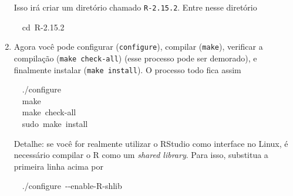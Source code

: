 \documentclass[a4paper,12pt]{article}\usepackage[]{graphicx}\usepackage[]{color}
\makeatletter
\newcommand{\hlnum}[1]{\textcolor[rgb]{0.686,0.059,0.569}{#1}}%
\newcommand{\hlopt}[1]{\textcolor[rgb]{0,0,0}{#1}}%
\newcommand{\hlstd}[1]{\textcolor[rgb]{0.345,0.345,0.345}{#1}}%
\newcommand{\hlkwb}[1]{\textcolor[rgb]{0.69,0.353,0.396}{#1}}%
\newcommand{\hlkwc}[1]{\textcolor[rgb]{0.333,0.667,0.333}{#1}}%
\newenvironment{kframe}{%
 \def\at@end@of@kframe{}%
 \ifinner\ifhmode%
  \def\at@end@of@kframe{\end{minipage}}%
  \begin{minipage}{\columnwidth}%
 \fi\fi%
 \def\FrameCommand##1{\hskip\@totalleftmargin \hskip-\fboxsep
 \colorbox{shadecolor}{##1}\hskip-\fboxsep
     \hskip-\linewidth \hskip-\@totalleftmargin \hskip\columnwidth}%
 \MakeFramed {\advance\hsize-\width
   \@totalleftmargin\z@ \linewidth\hsize
   \@setminipage}}%
 {\par\unskip\endMakeFramed%
 \at@end@of@kframe}
\newenvironment{knitrout}{}{} %
\providecommand{\R}{\textsf{R}\xspace}
\providecommand{\RStudio}{\textsf{RStudio}\xspace}
\makeatother
\begin{document}
\begin{enumerate}
  Isso irá criar um diretório chamado \texttt{R-2.15.2}. Entre nesse
  diretório
\begin{knitrout}\small
{}\color{fgcolor}\begin{kframe}
\noindent
\ttfamily
\hlstd{}\hlstd{\ \ }\hlstd{}\hlkwb{cd\ }\hlstd{R}\hlopt{{-}}\hlstd{}\hlnum{2.15.2}\hlstd{}\hspace*{\fill}
\mbox{}
\normalfont
\normalsize
\end{kframe}
\end{knitrout}

\item Agora você pode configurar (\texttt{configure}), compilar
  (\texttt{make}), verificar a compilação (\texttt{make check-all})
  (esse processo pode ser demorado), e finalmente instalar (\texttt{make
  install}). O processo todo fica assim
\begin{knitrout}\small
{}\color{fgcolor}\begin{kframe}
\noindent
\ttfamily
\hlstd{}\hlstd{\ \ }\hlstd{.}\hlopt{/}\hlstd{configure\hspace*{\fill}\\
}\hlstd{\ \ }\hlstd{}\hlkwc{make}\hspace*{\fill}\\
\hlstd{}\hlstd{\ \ }\hlstd{}\hlkwc{make\ }\hlstd{check}\hlopt{{-}}\hlstd{all\hspace*{\fill}\\
}\hlstd{\ \ }\hlstd{sudo\ }\hlkwc{make\ install}\hlstd{}\hspace*{\fill}
\mbox{}
\normalfont
\normalsize
\end{kframe}
\end{knitrout}

  Detalhe: se você for realmente utilizar o \RStudio como interface no
  Linux, é necessário compilar o \R como um \textit{shared
    library}. Para isso, substitua a primeira linha acima por
\begin{knitrout}\small
{}\color{fgcolor}\begin{kframe}
\noindent
\ttfamily
\hlstd{}\hlstd{\ \ }\hlstd{.}\hlopt{/}\hlstd{configure\ }\hlopt{{-}{-}}\hlstd{}\hlkwb{enable}\hlstd{}\hlopt{{-}}\hlstd{R}\hlopt{{-}}\hlstd{shlib}\hspace*{\fill}
\mbox{}
\normalfont
\normalsize
\end{kframe}
\end{knitrout}


\end{enumerate}
\end{document}
